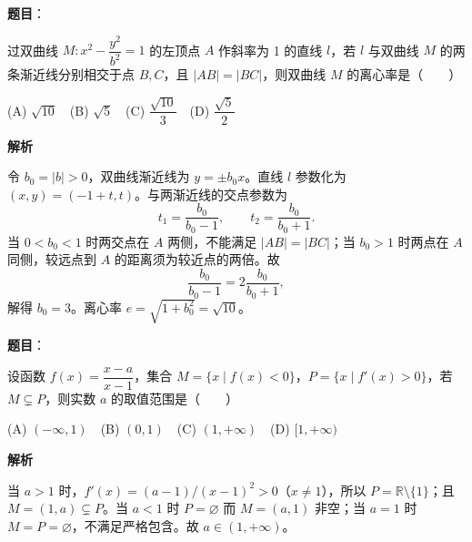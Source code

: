 \begin{answer}

\textbf{题目}：

过双曲线 $M:x^2-\dfrac{y^2}{b^2}=1$ 的左顶点 $A$ 作斜率为 1 的直线 $l$，若 $l$ 与双曲线 $M$ 的两条渐近线分别相交于点 $B,C$，且 $|AB|=|BC|$，则双曲线 $M$ 的离心率是\mbox{（　　）}

(A) $\sqrt{10}$　(B) $\sqrt5$　(C) $\dfrac{\sqrt{10}}3$　(D) $\dfrac{\sqrt5}2$

\textbf{解析}

令 $b_0=|b|>0$，双曲线渐近线为 $y=\pm b_0x$。直线 $l$ 参数化为 $(x,y)=(-1+t,t)$。与两渐近线的交点参数为
\nopagebreak[4]
\[
t_1=\frac{b_0}{b_0-1},\qquad t_2=\frac{b_0}{b_0+1}.
\]
当 $0<b_0<1$ 时两交点在 $A$ 两侧，不能满足 $|AB|=|BC|$；当 $b_0>1$ 时两点在 $A$ 同侧，较远点到 $A$ 的距离须为较近点的两倍。故
\nopagebreak[4]
\[
\frac{b_0}{b_0-1}=2\frac{b_0}{b_0+1},
\]
解得 $b_0=3$。离心率 $e=\sqrt{1+b_0^2}=\sqrt{10}$。


\end{answer}
\begin{answer}

\textbf{题目}：

设函数 $f(x)=\dfrac{x-a}{x-1}$，集合 $M=\{x\mid f(x)<0\}$，$P=\{x\mid f'(x)>0\}$，若 $M\subsetneq P$，则实数 $a$ 的取值范围是\mbox{（　　）}

(A) $(-\infty,1)$　(B) $(0,1)$　(C) $(1,+\infty)$　(D) $[1,+\infty)$

\textbf{解析}

当 $a>1$ 时，$f'(x)=(a-1)/(x-1)^2>0$（$x\ne1$），所以 $P=\mathbb R\setminus\{1\}$；且 $M=(1,a)\subsetneq P$。当 $a<1$ 时 $P=\varnothing$ 而 $M=(a,1)$ 非空；当 $a=1$ 时 $M=P=\varnothing$，不满足严格包含。故 $a\in(1,+\infty)$。


\end{answer}
